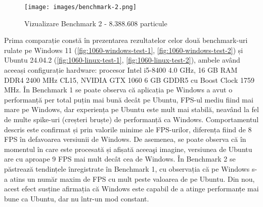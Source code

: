 \begin{figure}[ht]
    \centering
    \texttt{[image: images/benchmark-2.png]}
    \caption{Vizualizare Benchmark 2 - 8.388.608 particule}
    \label{fig:benchmark-2}
\end{figure}

Prima comparație constă în prezentarea rezultatelor celor două benchmark-uri rulate pe Windows 11 (\autoref{fig:1060-windows-test-1}, \autoref{fig:1060-windows-test-2}) și Ubuntu 24.04.2 (\autoref{fig:1060-linux-test-1}, \autoref{fig:1060-linux-test-2}), ambele având aceeași configurație hardware: procesor Intel i5-8400 4.0 GHz, 16 GB RAM DDR4 2400 MHz CL15, NVIDIA GTX 1060 6 GB GDDR5 cu Boost Clock 1759 MHz. În Benchmark 1 se poate observa că aplicația pe Windows a avut o performanță per total puțin mai bună decât pe Ubuntu, FPS-ul mediu fiind mai mare pe Windows, dar experiența pe Ubuntu este mult mai stabilă, neavând la fel de multe spike-uri (creșteri bruște) de performanță ca Windows. Comportamentul descris este confirmat și prin valorile minime ale FPS-urilor, diferența fiind de 8 FPS în defavoarea versiunii de Windows. De asemenea, se poate observa că în momentul în care este procesată și afișată aceeaşi imagine, versiunea de Ubuntu are cu aproape 9 FPS mai mult decât cea de Windows. În Benchmark 2 se păstrează tendințele înregistrate în Benchmark 1, cu observația că pe Windows s-a atins un număr maxim de FPS cu mult peste valoarea de pe Ubuntu. Din nou, acest efect susține afirmația că Windows este capabil de a atinge performanțe mai bune ca Ubuntu, dar nu într-un mod constant. 

